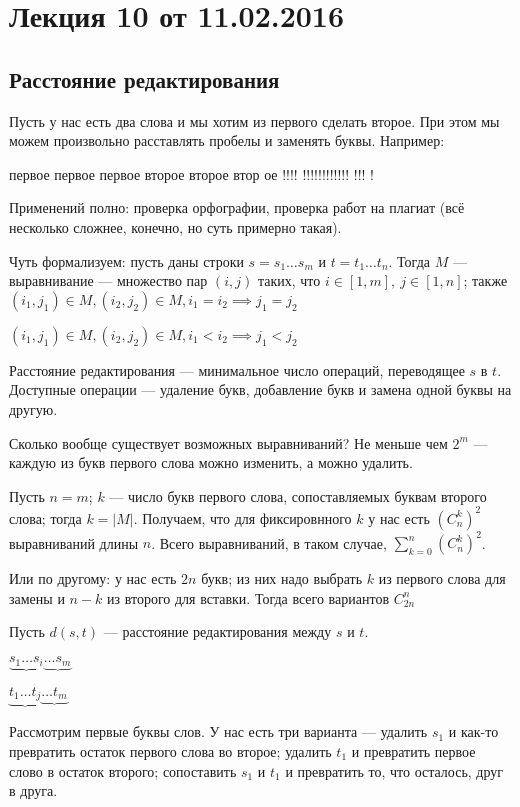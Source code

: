 


\section*{Лекция 10 от 11.02.2016}

\subsection{Расстояние редактирования}

Пусть у нас есть два слова и мы хотим из первого сделать второе. При этом мы можем произвольно расставлять пробелы и заменять буквы. Например:

первое  первое           первое
второе        второе    втор ое
!!!!    !!!!!!!!!!!!    !!! !

Применений полно: проверка орфографии, проверка работ на плагиат (всё несколько сложнее, конечно, но суть примерно такая).

Чуть формализуем: пусть даны строки $s = s_1\ldots s_m$ и $t = t_1\ldots t_n$. Тогда $M$ --- выравнивание --- множество пар $(i,j)$ таких, что $i\in[1,m],\ j\in[1,n]$; также 
$(i_1, j_1)\in M, (i_2, j_2)\in M, i_1 = i_2 \implies j_1 = j_2$

$(i_1, j_1)\in M, (i_2, j_2)\in M, i_1 < i_2 \implies j_1 < j_2$

Расстояние редактирования --- минимальное число операций, переводящее $s$ в $t$. Доступные операции --- удаление букв, добавление букв и замена одной буквы на другую.

Сколько вообще существует возможных выравниваний? Не меньше чем $2^m$ --- каждую из букв первого слова можно изменить, а можно удалить.

Пусть $n=m$; $k$ --- число букв первого слова, сопоставляемых буквам второго слова; тогда $k = |M|$. Получаем, что для фиксировнного $k$ у нас есть $(C_n^k)^2$ выравниваний длины $n$. Всего выравниваний, в таком случае, $\sum\limits_{k=0}^n(C_n^k)^2$.

Или по другому: у нас есть $2n$ букв; из них надо выбрать $k$ из первого слова для замены и $n-k$ из второго для вставки. Тогда всего вариантов $C_{2n}^n$

Пусть $d(s, t)$ --- расстояние редактирования между $s$ и $t$.

$\underbrace{s_1\ldots s_i}\underbrace{\ldots s_m}$

$\underbrace{t_1\ldots t_j}\underbrace{\ldots t_m}$

Рассмотрим первые буквы слов. У нас есть три варианта --- удалить $s_1$ и как-то превратить остаток первого слова во второе; удалить $t_1$ и превратить первое слово в остаток второго; сопоставить $s_1$ и $t_1$ и превратить то, что осталось, друг в друга.

